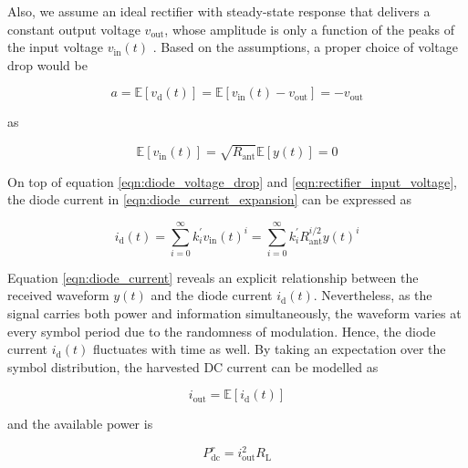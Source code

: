 Also, we assume an ideal rectifier with steady-state response that delivers a constant output voltage ${v_{{\text{out}}}}$, whose amplitude is only a function of the peaks of the input voltage ${v_{{\text{in}}}}(t)$ \cite{Curty2005}. Based on the assumptions, a proper choice of voltage drop would be

\begin{equation}\label{eqn:diode_voltage_drop}
  a = \mathbb{E}\left[ {{v_{\text{d}}}(t)} \right] = \mathbb{E}\left[ {{v_{{\text{in}}}}(t) - {v_{{\text{out}}}}} \right] =  - {v_{{\text{out}}}}
\end{equation}

as

\begin{equation}\label{eqn:output_voltage_expectation}
  \mathbb{E}\left[ {{v_{{\text{in}}}}(t)} \right] = \sqrt {{R_{{\text{ant}}}}} \mathbb{E}\left[ {y(t)} \right] = 0
\end{equation}

On top of equation \ref{eqn:diode_voltage_drop} and \ref{eqn:rectifier_input_voltage}, the diode current in \ref{eqn:diode_current_expansion} can be expressed as

\begin{equation}\label{eqn:diode_current}
  {i_{\text{d}}}(t) = \sum\limits_{i = 0}^\infty  {k_i^\prime } {v_{{\text{in}}}}{(t)^i} = \sum\limits_{i = 0}^\infty  {k_i^\prime } R_{{\text{ant}}}^{i/2}y{(t)^i}
\end{equation}

Equation \ref{eqn:diode_current} reveals an explicit relationship between the received waveform $y(t)$ and the diode current ${i_{\text{d}}}(t)$. Nevertheless, as the signal carries both power and information simultaneously, the waveform varies at every symbol period due to the randomness of modulation. Hence, the diode current ${i_{\text{d}}}(t)$ fluctuates with time as well. By taking an expectation over the symbol distribution, the harvested DC current can be modelled as

\begin{equation}\label{eqn:diode_current_expectation}
  {i_{{\text{out}}}} = \mathbb{E}\left[ {{i_{\text{d}}}(t)} \right]
\end{equation}

and the available power is

\begin{equation}\label{eqn:harvested_power}
  P_{{\text{dc}}}^r = i_{{\text{out}}}^2{R_{\text{L}}}
\end{equation}

